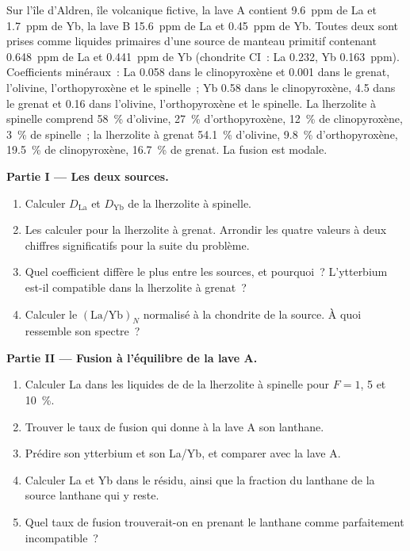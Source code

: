 \begin{problem}\label{pb:b3:trace-element-modelling:1}
Sur l'île d'Aldren, île volcanique fictive, la lave A contient \qty{9.6}{ppm} de La
et \qty{1.7}{ppm} de Yb, la lave B \qty{15.6}{ppm} de La et \qty{0.45}{ppm} de Yb.
Toutes deux sont prises comme liquides primaires d'une source de manteau primitif
contenant \qty{0.648}{ppm} de La et \qty{0.441}{ppm} de Yb (chondrite CI~: La 0.232, Yb
\qty{0.163}{ppm}). Coefficients minéraux~: La 0.058 dans le clinopyroxène et 0.001
dans le grenat, l'olivine, l'orthopyroxène et le spinelle~; Yb 0.58 dans le
clinopyroxène, 4.5 dans le grenat et 0.16 dans l'olivine, l'orthopyroxène et le spinelle.
La lherzolite à spinelle comprend \qty{58}{\percent} d'olivine, \qty{27}{\percent} d'orthopyroxène, \qty{12}{\percent}
de clinopyroxène, \qty{3}{\percent} de spinelle~; la lherzolite à grenat \qty{54.1}{\percent} d'olivine, \qty{9.8}{\percent}
d'orthopyroxène, \qty{19.5}{\percent} de clinopyroxène, \qty{16.7}{\percent} de grenat. La fusion est modale.

\medskip\noindent\textbf{Partie I --- Les deux sources.}
\begin{enumerate}
\item Calculer $D_{\mathrm{La}}$ et $D_{\mathrm{Yb}}$ de la lherzolite à spinelle.
\item Les calculer pour la lherzolite à grenat. Arrondir les quatre valeurs à deux chiffres
significatifs pour la suite du problème.
\item Quel coefficient diffère le plus entre les sources, et pourquoi~? L'ytterbium est-il
compatible dans la lherzolite à grenat~?
\item Calculer le $(\mathrm{La}/\mathrm{Yb})_N$ normalisé à la chondrite de la
source. À quoi ressemble son spectre~?
\end{enumerate}

\medskip\noindent\textbf{Partie II --- Fusion à l'équilibre de la lave A.}
\begin{enumerate}[resume]
\item Calculer La dans les liquides de  de la lherzolite à spinelle pour $F = 1$, 5 et
\qty{10}{\percent}.
\item Trouver le taux de fusion qui donne à la lave A son lanthane.
\item Prédire son ytterbium et son La/Yb, et comparer avec la lave A.
\item Calculer La et Yb dans le résidu, ainsi que la fraction du lanthane de la source
lanthane qui y reste.
\item Quel taux de fusion trouverait-on en prenant le lanthane comme parfaitement
incompatible~?
\end{enumerate}


\end{problem}
